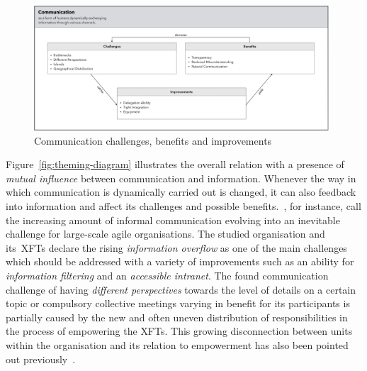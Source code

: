 \begin{figure}[h!]
  \centering
  \includegraphics[width=0.98\textwidth]{figures/communication.png}
  \caption{Communication challenges, benefits and improvements}
  \label{fig:communication}
\end{figure}

Figure~\ref{fig:theming-diagram} illustrates the overall relation with a presence of \emph{mutual influence} between communication and information. Whenever the way in which communication is dynamically carried out is changed, it can also feedback into information and affect its challenges and possible benefits.~\citet{pikkarainen2008impactagilecommunication}, for instance, call the increasing amount of informal communication evolving into an inevitable challenge for large-scale agile organisations. The studied organisation and its~\acp{XFT} declare the rising \emph{information overflow} as one of the main challenges which should be addressed with a variety of improvements such as an ability for \emph{information filtering} and an \emph{accessible intranet}. The found communication challenge of having \emph{different perspectives} towards the level of details on a certain topic or compulsory collective meetings varying in benefit for its participants is partially caused by the new and often uneven distribution of responsibilities in the process of empowering the \acp{XFT}. This growing disconnection between units within the organisation and its relation to empowerment has also been pointed out previously~\citep{millslimitsempowerment, tessemindividualempoqerment}.

